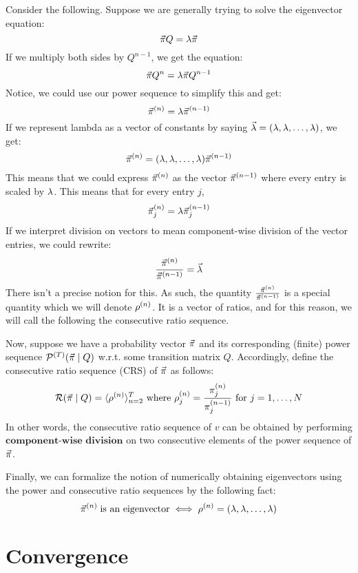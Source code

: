 
Consider the following. Suppose we are generally trying to solve the eigenvector equation:
$$\pivec Q = \l \pivec$$
If we multiply both sides by $Q^{n-1}$, we get the equation:
$$\pivec Q^n = \l \pivec Q^{n - 1}$$
Notice, we could use our power sequence to simplify this and get:
$$\pivecn{n} = \l \pivecn{n-1}$$
If we represent lambda as a vector of constants by saying $\vec{\l} = (\l, \l, \dots, \l)$, we get:
$$\pivecn{n} = \lambdasvec \pivecn{n - 1}$$
This means that we could express $\pivecn{n}$ as the vector $\pivecn{n - 1}$ where every entry is scaled by $\l$. This means that for every entry $j$,
$$\pivecn{n}_j = \lambda \pivecn{n - 1}_j$$
If we interpret division on vectors to mean component-wise division of the vector entries, we could rewrite:
$$\frac{\pivecn{n}}{\pivecn{n-1}} = \vec{\l}$$
 There isn't a precise notion for this.
As such, the quantity $\frac{\pivecn{n}}{\pivecn{n-1}}$ is a special quantity which we will denote $\rvecn{n}$.
It is a vector of ratios, and for this reason, we will call the following the consecutive ratio sequence.

\begin{definition}
Now, suppose we have a probability vector $\pivec$ and its corresponding (finite) power sequence $\Seq^{(\maxtime)}(\pivec \mid Q)$ w.r.t. some transition matrix $Q$.
Accordingly, define the consecutive ratio sequence (CRS) of $\pivec$ as follows:
$$\Rseq(\pivec \mid Q) = \langle \rvecn{n} \rangle_{n=2}^\maxtime \text{ where } \rvecn{n}_j = \frac{\pin{n}_j}{\pin{n-1}_j} \text{ for } j = \oneto[N]$$
In other words, the consecutive ratio sequence of $v$ can be obtained by performing $\textbf{component-wise division}$ on two consecutive elements of the power sequence of $\pivec$.
\end{definition}



Finally, we can formalize the notion of numerically obtaining eigenvectors using the power and consecutive ratio sequences by the following fact:
$$ \pivecn{n} \; \text{is an eigenvector} \iff \rvecn{n} = \lambdasvec$$

\section{Convergence}

